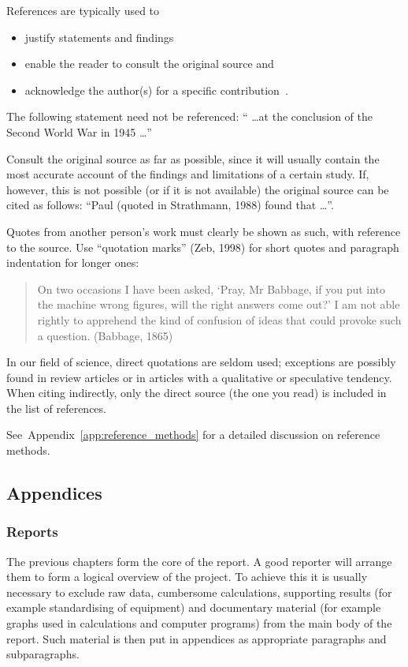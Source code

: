 \documentclass[a5paper, 10pt]{article}
\begin{document}
References are typically used to 
\begin{itemize}
\item justify statements and findings
\item enable the reader to consult the original source and
\item acknowledge the author(s) for a specific
  contribution~\citep{burger}.
\end{itemize}

The following statement need not be referenced: `` \dots at
the conclusion of the Second World War in 1945 \dots''

Consult the original source as far as possible, since it will usually
contain the most accurate account of the findings and limitations of a
certain study.  If, however, this is not possible (or if it is not
available) the original source can be cited as follows: ``Paul (quoted
in Strathmann, 1988) found that \dots''.  

Quotes from another person's work must clearly be shown as such, with
reference to the source.  Use ``quotation marks'' (Zeb, 1998) for
short quotes and paragraph indentation for longer ones:

\begin{quote}
  On two occasions I have been asked, `Pray, Mr Babbage, if you put
  into the machine wrong figures, will the right answers come out?' I
  am not able rightly to apprehend the kind of confusion of ideas that
  could provoke such a question. (Babbage, 1865)
\end{quote}

In our field of science, direct quotations
are seldom used; exceptions are possibly found in review articles or
in articles with a qualitative or speculative tendency.  When citing
indirectly, only the direct source (the one you read) is included in
the list of references.

See~Appendix~\ref{app:reference_methods} for a detailed discussion on
reference methods.

\subsection{Appendices}
\label{sec:appendices}
\subsubsection{Reports}
The previous chapters form the core of the report.  A good reporter
will arrange them to form a logical overview of the project.  To
achieve this it is usually necessary to exclude raw data, cumbersome
calculations, supporting results (for example standardising of
equipment) and documentary material (for example graphs used in
calculations and computer programs) from the main body of the
report.  Such material is then put in appendices as appropriate
paragraphs and subparagraphs.
\end{document}

